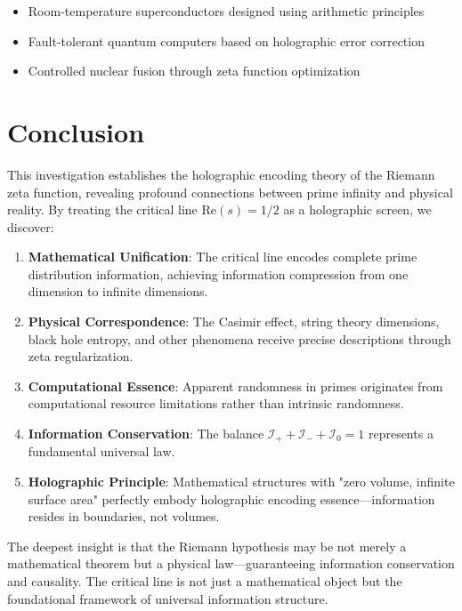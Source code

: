 \documentclass[12pt]{article}
\begin{document}
\begin{itemize}
\item Room-temperature superconductors designed using arithmetic principles
\item Fault-tolerant quantum computers based on holographic error correction
\item Controlled nuclear fusion through zeta function optimization
\end{itemize}

\section{Conclusion}

This investigation establishes the holographic encoding theory of the Riemann zeta function, revealing profound connections between prime infinity and physical reality. By treating the critical line $\text{Re}(s) = 1/2$ as a holographic screen, we discover:

\begin{enumerate}
\item \textbf{Mathematical Unification}: The critical line encodes complete prime distribution information, achieving information compression from one dimension to infinite dimensions.

\item \textbf{Physical Correspondence}: The Casimir effect, string theory dimensions, black hole entropy, and other phenomena receive precise descriptions through zeta regularization.

\item \textbf{Computational Essence}: Apparent randomness in primes originates from computational resource limitations rather than intrinsic randomness.

\item \textbf{Information Conservation}: The balance $\mathcal{I}_+ + \mathcal{I}_- + \mathcal{I}_0 = 1$ represents a fundamental universal law.

\item \textbf{Holographic Principle}: Mathematical structures with "zero volume, infinite surface area" perfectly embody holographic encoding essence—information resides in boundaries, not volumes.
\end{enumerate}

The deepest insight is that the Riemann hypothesis may be not merely a mathematical theorem but a physical law—guaranteeing information conservation and causality. The critical line is not just a mathematical object but the foundational framework of universal information structure.
\end{document}
